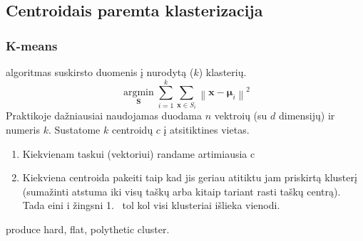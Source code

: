 \documentclass{VUMIFInfKursinis}
\begin{document}
	{}
	\subsection{Centroidais paremta klasterizacija}
		\subsubsection{K-means}
			 algoritmas suskirsto duomenis į nurodytą ($ k $) klasterių. \[ \underset{\mathbf{S}} {\operatorname{\arg \min}}  \sum_{i=1}^{k} \sum_{\mathbf x \in S_i} \left\| \mathbf x - \boldsymbol\mu_i \right\|^2 \]
			Praktikoje dažniausiai naudojamas duodama $n$ vektroių (su $d$ dimensijų) ir numeris $k$.  Sustatome $k$ centroidų $c$ į atsitiktines vietas.
			\begin{enumerate}
				\item Kiekvienam taskui (vektoriui) randame artimiausia c
				\item Kiekviena centroida pakeiti taip kad jis geriau atitiktu jam priskirtą klusterį (sumažinti atstuma iki visų taškų arba kitaip tariant rasti taškų centrą). Tada eini i žingsni  1.\ %
				tol kol visi klusteriai išlieka vienodi.
			\end{enumerate}
			 produce hard, flat, polythetic cluster. 
		
\end{document}
